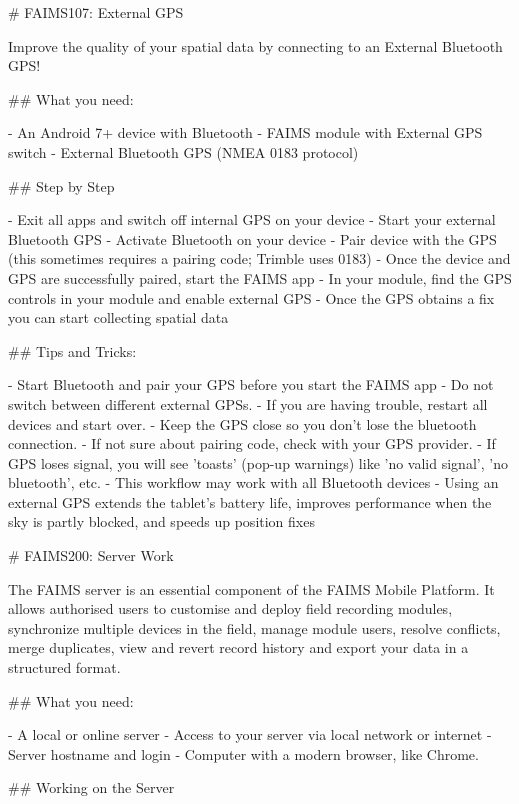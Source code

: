 # FAIMS107: External GPS

Improve the quality of your spatial data by connecting to an External Bluetooth GPS!

## What you need:

-  An Android 7+ device with Bluetooth
-  FAIMS module with External GPS switch
-  External Bluetooth GPS (NMEA 0183 protocol)



## Step by Step

-  Exit all apps and switch off internal GPS on your device
-  Start your external Bluetooth GPS
-  Activate Bluetooth on your device
-  Pair device with the GPS (this sometimes requires a pairing code; Trimble uses 0183)
-  Once the device and GPS are successfully paired, start the FAIMS app
-  In your module, find the GPS controls in your module and enable external GPS
-  Once the GPS obtains a fix you can start collecting spatial data




## Tips and Tricks:

-  Start Bluetooth and pair your GPS before you start the FAIMS app
-  Do not switch between different external GPSs.
-  If you are having trouble, restart all devices and start over.
-  Keep the GPS close so you don’t lose the bluetooth connection.
-  If not sure about pairing code, check with your GPS provider.
-  If GPS loses signal, you will see 'toasts' (pop-up warnings) like 'no valid signal', 'no bluetooth', etc.
-  This workflow may work with all Bluetooth devices
-  Using an external GPS extends the tablet’s battery life, improves performance when the sky is partly blocked, and speeds up position fixes






# FAIMS200: Server Work


The FAIMS server is an essential component of the FAIMS Mobile Platform. It allows authorised users to customise and deploy field recording modules, synchronize multiple devices in the field, manage module users, resolve conflicts, merge duplicates, view and revert record history and export your data in a structured format.

## What you need:

-  A local or online server
-  Access to your server via local network or internet
-  Server hostname and login
-  Computer with a modern browser, like Chrome.


## Working on the Server

